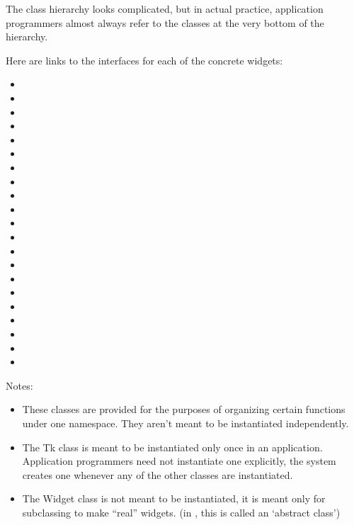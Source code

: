 The class hierarchy looks complicated, but in actual practice,
application programmers almost always refer to the classes at the very
bottom of the hierarchy. 

Here are links to the interfaces for each of the concrete widgets:

\begin{itemize}
\item   {}  
\item   {} 
\item   {} 
\item   {} 
\item   {} 
\item   {} 
\item   {} 
\item   {} 
\item   {}  
\item   {}  
\item   {} 
\item   {} 
\item   {}  
\item   {}  
\item   {}  
\item   {} 
\item   {} 
\item   {} 
\item   {}  
\item   {}  
\item   {} 
\end{itemize}


Notes:
\begin{itemize}
\item   These classes are provided for the purposes of
organizing certain functions under one namespace. They aren't meant to
be instantiated independently.
\item    The Tk class is meant to be instantiated only once in
an application. Application programmers need not instantiate one
explicitly, the system creates one whenever any of the other classes
are instantiated.
\item    The Widget class is not meant to be instantiated, it
is meant only for subclassing to make ``real'' widgets. (in \Cpp, this
is called an `abstract class')
\end{itemize}
\fi


